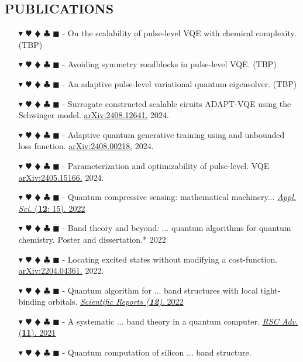 \documentclass[overlapped, 10pt]{res} %
\newcommand{\physics}{$\blacktriangledown$}
\newcommand{\biochem}{$\varheartsuit$}
\newcommand{\shannon}{$\vardiamondsuit$}
\newcommand{\classic}{$\clubsuit$}
\newcommand{\quantum}{$\blacksquare$}
\newcommand{\physicscolor}{\color{YellowOrange}}
\newcommand{\biochemcolor}{\color{Emerald}}
\newcommand{\shannoncolor}{\color{Goldenrod}}
\newcommand{\classiccolor}{\color{Cyan}}
\newcommand{\quantumcolor}{\color{RedOrange}}
\newcommand{\tag}[1]{
    {\IfSubStr{#1}{\physics}{\physicscolor}{\color{White}}\physics}
    {\IfSubStr{#1}{\biochem}{\biochemcolor}{\color{White}}\biochem}
    {\IfSubStr{#1}{\shannon}{\shannoncolor}{\color{White}}\shannon}
    {\IfSubStr{#1}{\classic}{\classiccolor}{\color{White}}\classic}
    {\IfSubStr{#1}{\quantum}{\quantumcolor}{\color{White}}\quantum}
}
\begin{document}
\begin{resume}
\section{PUBLICATIONS}
\begin{itemize} \itemsep -2pt %
\item[\tag{\physics\biochem\shannon\quantum}-] On the scalability of pulse-level VQE with chemical complexity. \hfill (TBP)
\item[\tag{\physics\biochem\shannon\quantum}-] Avoiding symmetry roadblocks in pulse-level VQE. \hfill (TBP)
\item[\tag{\physics\biochem\shannon\quantum}-] An adaptive pulse-level variational quantum eigensolver. \hfill (TBP)
\item[\tag{\physics\quantum}-] Surrogate constructed scalable ciruits ADAPT-VQE using the Schwinger model. \hfill \href{https://arxiv.org/abs/2408.12641}{arXiv:2408.12641.} 2024.
\item[\tag{\physics\shannon\quantum}-] Adaptive quantum generative training using and unbounded loss function. \hfill \href{https://arxiv.org/abs/2408.00218}{arXiv:2408.00218.} 2024.
\item[\tag{\physics\biochem\quantum}-] Parameterization and optimizability of pulse-level. VQE \hfill \href{https://arxiv.org/abs/2405.15166}{arXiv:2405.15166.} 2024.
\item[\tag{\shannon\quantum}-] Quantum compressive sensing: mathematical machinery...
    \hfill \href{https://arxiv.org/abs/2204.13035}{\textit{Appl. Sci.} (\textbf{12}: 15). 2022}
\item[\tag{\physics\biochem\shannon\quantum}-] Band theory and beyond: ... quantum algorithms for quantum chemistry.
    \hfill Poster and dissertation.* 2022
\item[\tag{\physics\quantum}-] Locating excited states without modifying a cost-function.
    \hfill \href{https://arxiv.org/abs/2204.04361}{arXiv:2204.04361.} 2022.
\item[\tag{\physics\quantum}-] Quantum algorithm for ... band structures with local tight-binding orbitals.
    \hfill \href{https://doi.org/10.21203/rs.3.rs-1318951/v1}{\textit{Scientific Reports (\textbf{12})}. 2022}
\item[\tag{\physics\quantum}-] A systematic ... band theory in a quantum computer.
    \hfill \href{https://arxiv.org/abs/2104.03409}{\textit{RSC Adv.} (\textbf{11}). 2021}
\item[\tag{\physics\quantum}-] Quantum computation of silicon ... band structure.

\end{itemize}
\end{resume}
\end{document}
